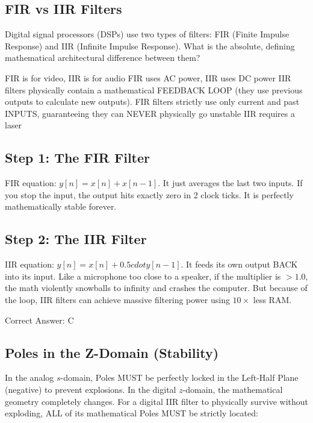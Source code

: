 \clearpage

\subsection{FIR vs IIR Filters}

Digital signal processors (DSPs) use two types of filters: FIR (Finite Impulse Response) and IIR (Infinite Impulse Response). What is the absolute, defining mathematical architectural difference between them?

\begin{choices}
    \choice FIR is for video, IIR is for audio
    \choice FIR uses AC power, IIR uses DC power
    \correctchoice IIR filters physically contain a mathematical FEEDBACK LOOP (they use previous outputs to calculate new outputs). FIR filters strictly use only current and past INPUTS, guaranteeing they can NEVER physically go unstable
    \choice IIR requires a laser
\end{choices}

\begin{solution}

\subsection*{Step 1: The FIR Filter}
FIR equation: $y[n] = x[n] + x[n-1]$. It just averages the last two inputs. If you stop the input, the output hits exactly zero in 2 clock ticks. It is perfectly mathematically stable forever.

\subsection*{Step 2: The IIR Filter}
IIR equation: $y[n] = x[n] + 0.5 cdot y[n-1]$. It feeds its own output BACK into its input. Like a microphone too close to a speaker, if the multiplier is $> 1.0$, the math violently snowballs to infinity and crashes the computer. But because of the loop, IIR filters can achieve massive filtering power using $10\times$ less RAM.

Correct Answer: C
\end{solution}

\clearpage

\subsection{Poles in the Z-Domain (Stability)}

In the analog $s$-domain, Poles MUST be perfectly locked in the Left-Half Plane (negative) to prevent explosions. In the digital $z$-domain, the mathematical geometry completely changes. For a digital IIR filter to physically survive without exploding, ALL of its mathematical Poles MUST be strictly located:

